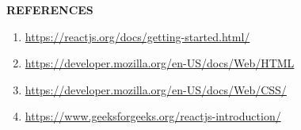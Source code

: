 \newpage
\vspace{5cm}
\centering
\LARGE{\textbf{REFERENCES}}
\begin{enumerate}
\vspace{3cm}
\item\href{https://reactjs.org/docs/getting-started.html/}{https://reactjs.org/docs/getting-started.html/}\\

\item
   \href{https://developer.mozilla.org/en-US/docs/Web/HTML}{https://developer.mozilla.org/en-US/docs/Web/HTML}\\

\item
   \href{https://developer.mozilla.org/en-US/docs/Web/CSS/}{https://developer.mozilla.org/en-US/docs/Web/CSS/}\\

\item
   \href{https://www.geeksforgeeks.org/reactjs-introduction/}{https://www.geeksforgeeks.org/reactjs-introduction/}\\

   
\end{enumerate}